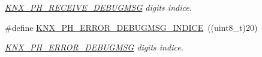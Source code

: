 \begin{DoxyCompactItemize}
\begin{DoxyCompactList}\small\item\em \hyperlink{group___k_n_x___p_h___sup___private___variables_ga29eb5f6a2e306cf5545c5a6af4623e35}{K\+N\+X\+\_\+\+P\+H\+\_\+\+R\+E\+C\+E\+I\+V\+E\+\_\+\+D\+E\+B\+U\+G\+M\+SG} digits indice. \end{DoxyCompactList}\item 
\#define \hyperlink{group___k_n_x___p_h___sup___private___variables_ga3901497762df9a18c2051bab3ca7b86c}{K\+N\+X\+\_\+\+P\+H\+\_\+\+E\+R\+R\+O\+R\+\_\+\+D\+E\+B\+U\+G\+M\+S\+G\+\_\+\+I\+N\+D\+I\+CE}~((uint8\+\_\+t)20)\hypertarget{group___k_n_x___p_h___sup___private___variables_ga3901497762df9a18c2051bab3ca7b86c}{}\label{group___k_n_x___p_h___sup___private___variables_ga3901497762df9a18c2051bab3ca7b86c}

\begin{DoxyCompactList}\small\item\em \hyperlink{group___k_n_x___p_h___sup___private___variables_ga598da98824813e3e2781a39bb3f90bfd}{K\+N\+X\+\_\+\+P\+H\+\_\+\+E\+R\+R\+O\+R\+\_\+\+D\+E\+B\+U\+G\+M\+SG} digits indice. \end{DoxyCompactList}\end{DoxyCompactItemize}
